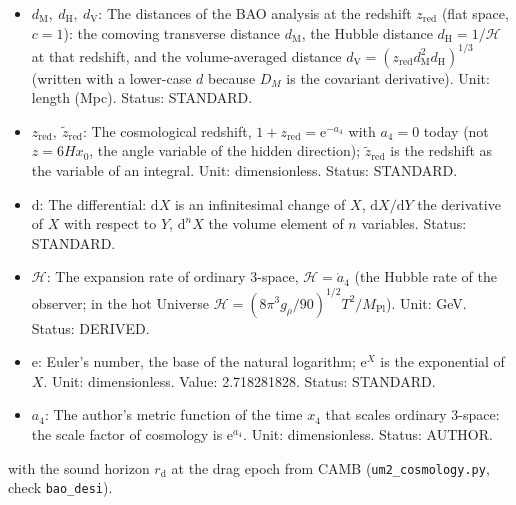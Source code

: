 \documentclass[
  10pt,
]{article}
\providecommand{\tightlist}{%
  \setlength{\itemsep}{0pt}\setlength{\parskip}{0pt}}
\begin{document}
\begin{itemize}
\tightlist
\item
  \(d_{\mathrm{M}},\ d_{\mathrm{H}},\ d_{\mathrm{V}}\): The distances of
  the BAO analysis at the redshift \(z_{\mathrm{red}}\) (flat space,
  \(c = 1\)): the comoving transverse distance \(d_{\mathrm{M}}\), the
  Hubble distance \(d_{\mathrm{H}} = 1/\mathcal{H}\) at that redshift,
  and the volume-averaged distance
  \(d_{\mathrm{V}} = (z_{\mathrm{red}}d_{\mathrm{M}}^2d_{\mathrm{H}})^{1/3}\)
  (written with a lower-case \(d\) because \(D_M\) is the covariant
  derivative). Unit: length (Mpc). Status: STANDARD.
\item
  \(z_{\mathrm{red}},\ \tilde z_{\mathrm{red}}\): The cosmological
  redshift, \(1 + z_{\mathrm{red}} = \mathrm{e}^{-a_4}\) with
  \(a_4 = 0\) today (not \(z = 6Hx_0\), the angle variable of the hidden
  direction); \(\tilde z_{\mathrm{red}}\) is the redshift as the
  variable of an integral. Unit: dimensionless. Status: STANDARD.
\item
  \(\mathrm{d}\): The differential: \(\mathrm{d}X\) is an infinitesimal
  change of \(X\), \(\mathrm{d}X/\mathrm{d}Y\) the derivative of \(X\)
  with respect to \(Y\), \(\mathrm{d}^nX\) the volume element of \(n\)
  variables. Status: STANDARD.
\item
  \(\mathcal{H}\): The expansion rate of ordinary 3-space,
  \(\mathcal{H} = \dot a_4\) (the Hubble rate of the observer; in the
  hot Universe
  \(\mathcal{H} = (8\pi^3g_\rho/90)^{1/2}T^2/M_{\mathrm{Pl}}\)). Unit:
  GeV. Status: DERIVED.
\item
  \(\mathrm{e}\): Euler's number, the base of the natural logarithm;
  \(\mathrm{e}^{X}\) is the exponential of \(X\). Unit: dimensionless.
  Value: 2.718281828. Status: STANDARD.
\item
  \(a_4\): The author's metric function of the time \(x_4\) that scales
  ordinary 3-space: the scale factor of cosmology is
  \(\mathrm{e}^{a_4}\). Unit: dimensionless. Status: AUTHOR.
\end{itemize}

with the sound horizon \(r_{\mathrm{d}}\) at the drag epoch from CAMB
(\texttt{um2\_cosmology.py}, check \texttt{bao\_desi}).
\end{document}
